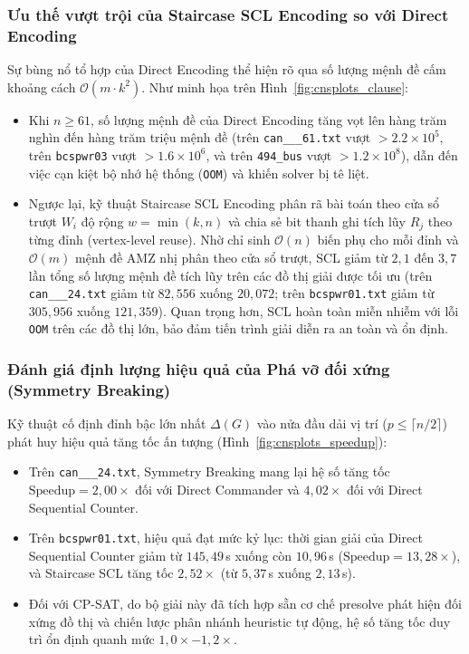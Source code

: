 \documentclass[a4paper,fleqn]{cas-sc}
\begin{document}
\subsubsection{Ưu thế vượt trội của Staircase SCL Encoding so với Direct Encoding}
Sự bùng nổ tổ hợp của Direct Encoding thể hiện rõ qua số lượng mệnh đề cấm khoảng cách $\mathcal{O}(m \cdot k^2)$. Như minh họa trên Hình~\ref{fig:cnsplots_clause}:
\begin{itemize}
    \item Khi $n \ge 61$, số lượng mệnh đề của Direct Encoding tăng vọt lên hàng trăm nghìn đến hàng trăm triệu mệnh đề (trên \texttt{can\_\_\_61.txt} vượt $> 2.2 \times 10^5$, trên \texttt{bcspwr03} vượt $> 1.6 \times 10^6$, và trên \texttt{494\_bus} vượt $> 1.2 \times 10^8$), dẫn đến việc cạn kiệt bộ nhớ hệ thống (\texttt{OOM}) và khiến solver bị tê liệt.
    \item Ngược lại, kỹ thuật Staircase SCL Encoding phân rã bài toán theo cửa sổ trượt $W_i$ độ rộng $w = \min(k, n)$ và chia sẻ bit thanh ghi tích lũy $R_j$ theo từng đỉnh (vertex-level reuse). Nhờ chỉ sinh $\mathcal{O}(n)$ biến phụ cho mỗi đỉnh và $\mathcal{O}(m)$ mệnh đề AMZ nhị phân theo cửa sổ trượt, SCL giảm từ $2{,}1$ đến $3{,}7$ lần tổng số lượng mệnh đề tích lũy trên các đồ thị giải được tối ưu (trên \texttt{can\_\_\_24.txt} giảm từ $82,556$ xuống $20,072$; trên \texttt{bcspwr01.txt} giảm từ $305,956$ xuống $121,359$). Quan trọng hơn, SCL hoàn toàn miễn nhiễm với lỗi \texttt{OOM} trên các đồ thị lớn, bảo đảm tiến trình giải diễn ra an toàn và ổn định.
\end{itemize}

\subsubsection{Đánh giá định lượng hiệu quả của Phá vỡ đối xứng (Symmetry Breaking)}
Kỹ thuật cố định đỉnh bậc lớn nhất $\Delta(G)$ vào nửa đầu dải vị trí ($p \le \lceil n/2 \rceil$) phát huy hiệu quả tăng tốc ấn tượng (Hình~\ref{fig:cnsplots_speedup}):
\begin{itemize}
    \item Trên \texttt{can\_\_\_24.txt}, Symmetry Breaking mang lại hệ số tăng tốc $\text{Speedup} = 2{,}00\times$ đối với Direct Commander và $4{,}02\times$ đối với Direct Sequential Counter.
    \item Trên \texttt{bcspwr01.txt}, hiệu quả đạt mức kỷ lục: thời gian giải của Direct Sequential Counter giảm từ $145{,}49$\,s xuống còn $10{,}96$\,s ($\text{Speedup} = 13{,}28\times$), và Staircase SCL tăng tốc $2{,}52\times$ (từ $5{,}37$\,s xuống $2{,}13$\,s).
    \item Đối với CP-SAT, do bộ giải này đã tích hợp sẵn cơ chế presolve phát hiện đối xứng đồ thị và chiến lược phân nhánh heuristic tự động, hệ số tăng tốc duy trì ổn định quanh mức $1{,}0\times - 1{,}2\times$.
\end{itemize}
\end{document}
